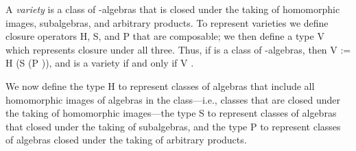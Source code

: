
A \emph{variety} is a class of -algebras that is closed under the taking of
homomorphic images, subalgebras, and arbitrary products.  To represent varieties
we define closure operators \af H, \af S, and \af P that are composable; we
then define a type \af V which represents closure under all three.
Thus, if  is a class of -algebras, then
\af V  := \af H (\af S (\af P )), and  is a variety if and only if \af V   .
\ifshort\else

We now define the type \af H to represent classes of algebras that include all homomorphic images
of algebras in the class---i.e., classes that are closed under the taking of homomorphic
images---the type \af S to represent classes of algebras that closed under the taking of subalgebras,
and the type \af P to represent classes of algebras closed under the taking of arbitrary products.

